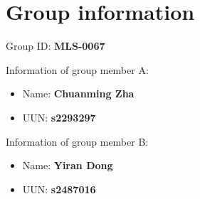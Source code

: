\documentclass{article}
\begin{document}
\section*{Group information}
Group ID: \textbf{MLS-0067}

Information of group member A:
\begin{itemize}
 \item Name: \textbf{Chuanming Zha}
 \item UUN: \textbf{s2293297}
\end{itemize}

Information of group member B:
\begin{itemize}
 \item Name: \textbf{Yiran Dong}
 \item UUN: \textbf{s2487016}
\end{itemize}

\end{document}
